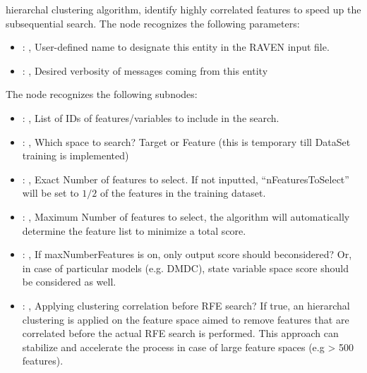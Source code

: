 \begin{itemize}
\begin{itemize}
          hierarchal clustering algorithm,         identify highly correlated features to speed up
          the subsequential search.
          The  node recognizes the following parameters:
            \begin{itemize}
              \item {}: , 
                User-defined name to designate this entity in the RAVEN input file.
              \item {}: , 
                Desired verbosity of messages coming from this entity
          \end{itemize}

          The  node recognizes the following subnodes:
          \begin{itemize}
            \item {}: , 
              List of IDs of features/variables to include in the search.

            \item {}: , 
              Which space to search? Target or Feature (this is temporary till DataSet training is
              implemented)

            \item {}: , 
              Exact Number of features to select. If not inputted, ``nFeaturesToSelect'' will be set
              to $1/2$ of the features in the training dataset.

            \item {}: , 
              Maximum Number of features to select, the algorithm will automatically determine the
              feature list to minimize a total score.

            \item {}: , 
              If maxNumberFeatures is on, only output score should beconsidered? Or, in case of
              particular models (e.g. DMDC), state variable space score should be considered as
              well.

            \item {}: , 
              Applying clustering correlation before RFE search? If true, an hierarchal clustering
              is applied on the feature         space aimed to remove features that are correlated
              before the actual RFE search is performed. This approach can stabilize and
              accelerate the process in case of large feature spaces (e.g > 500 features).


\end{itemize}
\end{itemize}
\end{itemize}
